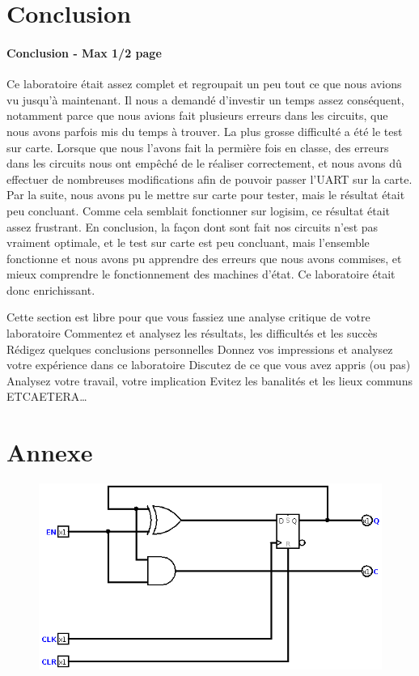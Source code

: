 \documentclass[a4paper]{article} %
\begin{document}
\section {Conclusion}
\begin{tcolorbox}[colframe=Monokaimagenta,colback=white]
\paragraph{Conclusion - Max 1/2 page}
Ce laboratoire était assez complet et regroupait un peu tout ce que nous avions vu jusqu'à maintenant. Il nous a demandé d'investir un temps assez conséquent, notamment parce que nous avions fait plusieurs erreurs dans les circuits, que nous avons parfois mis du temps à trouver.
La plus grosse difficulté a été le test sur carte. Lorsque que nous l'avons fait la permière fois en classe, des erreurs dans les circuits nous ont empêché de le réaliser correctement, et nous avons dû effectuer de nombreuses modifications afin de pouvoir passer l'UART sur la carte. Par la suite, nous avons pu le mettre sur carte pour tester, mais le résultat était peu concluant. Comme cela semblait fonctionner sur logisim, ce résultat était assez frustrant.
En conclusion, la façon dont sont fait nos circuits n'est pas vraiment optimale, et le test sur carte est peu concluant, mais l'ensemble fonctionne et nous avons pu apprendre des erreurs que nous avons commises, et mieux comprendre le fonctionnement des machines d'état. Ce laboratoire était donc enrichissant.

Cette section est libre pour que vous fassiez une analyse critique de votre laboratoire
Commentez et analysez 
les résultats, 
les difficultés et les succès
Rédigez quelques conclusions personnelles
Donnez vos impressions et analysez votre expérience dans ce laboratoire
Discutez de ce que vous avez appris (ou pas)
Analysez votre travail, votre implication
Evitez les banalités et les lieux communs
ETCAETERA…
\\
\end{tcolorbox}

\section{Annexe}


\begin{figure}[H]
\centering
    \includegraphics[width=.8\textwidth]{src/COUNT_BASE.png}
    \label{fig:countBase}
    \end{figure}
\end{document}

